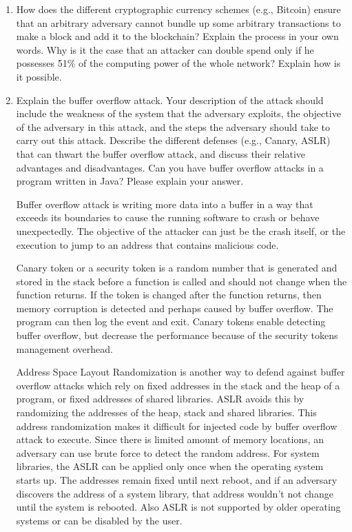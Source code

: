 \documentclass[12pt,a4paper]{article}
\begin{document}
\begin{enumerate}
\item How does the different cryptographic currency schemes (e.g., Bitcoin) ensure
that an arbitrary adversary cannot bundle up some arbitrary transactions to make a
block and add it to the blockchain? Explain the process in your own words. Why is it
the case that an attacker can double spend only if he possesses 51\% of the computing
power of the whole network? Explain how is it possible.


\color{blue}


\color{black}

\item Explain the buffer overflow attack. Your description of the attack should
include the weakness of the system that the adversary exploits, the objective of the
adversary in this attack, and the steps the adversary should take to carry out this
attack. Describe the different defenses (e.g., Canary, ASLR) that can thwart the buffer overflow attack, and discuss their relative advantages and disadvantages. Can you have buffer overflow attacks in a program written in Java? Please explain your answer.


\color{blue}
Buffer overflow attack is writing more data into a buffer in a way that exceeds its boundaries to cause the running software to crash or behave unexpectedly. The objective of the attacker can just be the crash itself, or  the execution to jump to an address that contains malicious code. 

Canary token or a security token is a random number that is generated and stored in the stack before a function is called and should not change when the function returns. If the token is changed after the function returns, then memory corruption is detected and perhaps caused by buffer overflow. The program can then log the event and exit. Canary tokens enable detecting buffer overflow, but decrease the performance because of the security tokens management overhead.

Address Space Layout Randomization is another way to defend against buffer overflow attacks which rely on fixed addresses in the stack and the heap of a program, or fixed addresses of shared libraries. ASLR avoids this by randomizing the addresses of the heap, stack and shared libraries. This address randomization makes it difficult for injected code by buffer overflow attack to execute. Since there is limited amount of memory locations, an adversary can use brute force to detect the random address.  For system libraries, the ASLR can be applied only once when the operating system starts up. The addresses remain fixed until next reboot, and if an adversary discovers the address of a system library, that address wouldn't not change until the system is rebooted. Also ASLR is not supported by older operating systems or can be disabled by the user.



\end{enumerate}
\end{document}
